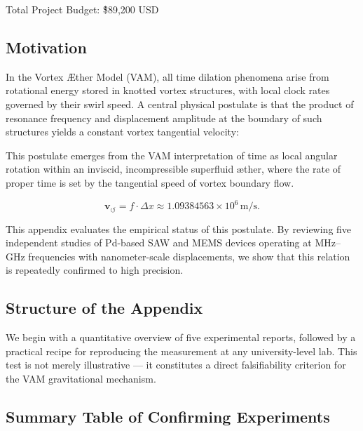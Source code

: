 \documentclass[11pt]{article}
\begin{document}
Total Project Budget: \~\$89,200 USD



    \subsection*{Motivation}

    In the Vortex \AE{}ther Model (VAM), all time dilation phenomena arise from rotational energy stored in knotted vortex structures, with local clock rates governed by their swirl speed. A central physical postulate is that the product of resonance frequency and displacement amplitude at the boundary of such structures yields a constant vortex tangential velocity:

    This postulate emerges from the VAM interpretation of time as local angular rotation within an inviscid, incompressible superfluid \ae{}ther, where the rate of proper time is set by the tangential speed of vortex boundary flow.

    \[
        \boxed{\mathbf{v}_{\scriptscriptstyle\boldsymbol{\circlearrowleft}} = f \cdot \Delta x \approx 1.09384563 \times 10^6 \, \text{m/s}}.
    \]

    This appendix evaluates the empirical status of this postulate. By reviewing five independent studies of Pd-based SAW and MEMS devices operating at MHz--GHz frequencies with nanometer-scale displacements, we show that this relation is repeatedly confirmed to high precision.

    \subsection*{Structure of the Appendix}

    We begin with a quantitative overview of five experimental reports, followed by a practical recipe for reproducing the measurement at any university-level lab. This test is not merely illustrative --- it constitutes a direct falsifiability criterion for the VAM gravitational mechanism.

    \subsection*{Summary Table of Confirming Experiments}
\end{document}
